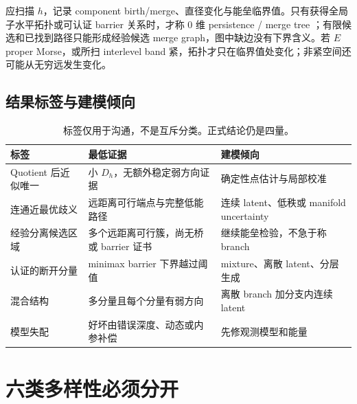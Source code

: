\documentclass[UTF8,a4paper,11pt]{ctexart}
\begin{document}
应扫描 $h$，记录 component birth/merge、直径变化与能垒临界值。只有获得全局
子水平拓扑或可认证 barrier 关系时，才称 0 维 persistence / merge tree
\citep{edelsbrunner2010computational}；有限候选和已找到路径只能形成经验候选
merge graph，图中缺边没有下界含义。若 $E$ proper Morse，或所扫 interlevel band
紧，拓扑才只在临界值处变化；非紧空间还可能从无穷远发生变化。

\subsection{结果标签与建模倾向}

\begin{table}[htbp]
\centering
\small
\begin{tabularx}{\textwidth}{>{\raggedright\arraybackslash}p{}XX}
\toprule
标签 & 最低证据 & 建模倾向\\
\midrule
Quotient 后近似唯一
  & 小 $D_h$，无额外稳定弱方向证据
  & 确定性点估计与局部校准\\
连通近最优歧义
  & 远距离可行端点与完整低能路径
  & 连续 latent、低秩或 manifold uncertainty\\
经验分离候选区域
  & 多个远距离可行簇，尚无桥或 barrier 证书
  & 继续能垒检验，不急于称 branch\\
认证的断开分量
  & minimax barrier 下界越过阈值
  & mixture、离散 latent、分层生成\\
混合结构
  & 多分量且每个分量有弱方向
  & 离散 branch 加分支内连续 latent\\
模型失配
  & 好坏由错误深度、动态或内参补偿
  & 先修观测模型和能量\\
\bottomrule
\end{tabularx}
\caption{标签仅用于沟通，不是互斥分类。正式结论仍是四量。}
\end{table}

\section{六类多样性必须分开}
\end{document}

